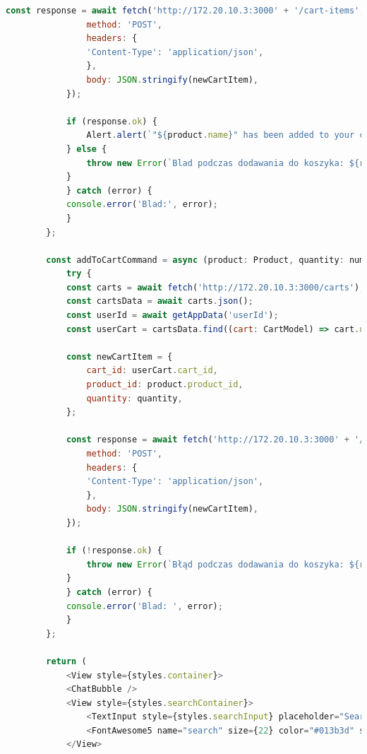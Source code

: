 \begin{lstlisting}[language=JavaScript, caption=Ekran produktów implementacja, label=lst:products_view]
            const response = await fetch('http://172.20.10.3:3000' + '/cart-items', {
                method: 'POST',
                headers: {
                'Content-Type': 'application/json',
                },
                body: JSON.stringify(newCartItem),
            });

            if (response.ok) {
                Alert.alert(`"${product.name}" has been added to your cart`);
            } else {
                throw new Error(`Blad podczas dodawania do koszyka: ${response.statusText}`);
            }
            } catch (error) {
            console.error('Blad:', error);
            }
        };

        const addToCartCommand = async (product: Product, quantity: number) => {
            try {
            const carts = await fetch('http://172.20.10.3:3000/carts');
            const cartsData = await carts.json();
            const userId = await getAppData('userId');
            const userCart = cartsData.find((cart: CartModel) => cart.user_id === userId);

            const newCartItem = {
                cart_id: userCart.cart_id,
                product_id: product.product_id,
                quantity: quantity,
            };

            const response = await fetch('http://172.20.10.3:3000' + '/cart-items', {
                method: 'POST',
                headers: {
                'Content-Type': 'application/json',
                },
                body: JSON.stringify(newCartItem),
            });

            if (!response.ok) {
                throw new Error(`Błąd podczas dodawania do koszyka: ${response.statusText}`);
            }
            } catch (error) {
            console.error('Blad: ', error);
            }
        };

        return (
            <View style={styles.container}>
            <ChatBubble />
            <View style={styles.searchContainer}>
                <TextInput style={styles.searchInput} placeholder="Search products" value={searchQuery} onChangeText={handleSearch} selectionColor="#013b3d" />
                <FontAwesome5 name="search" size={22} color="#013b3d" style={styles.searchIcon} />
            </View>


\end{lstlisting}
